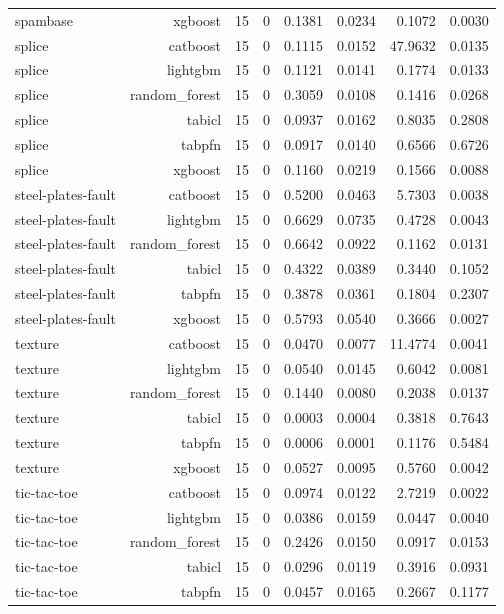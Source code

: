 \begin{table}[htbp]
\begin{tabular}{lrrrrrrr}
spambase & xgboost & 15 & 0 & 0.1381 & 0.0234 & 0.1072 & 0.0030 \\
splice & catboost & 15 & 0 & 0.1115 & 0.0152 & 47.9632 & 0.0135 \\
splice & lightgbm & 15 & 0 & 0.1121 & 0.0141 & 0.1774 & 0.0133 \\
splice & random\_forest & 15 & 0 & 0.3059 & 0.0108 & 0.1416 & 0.0268 \\
splice & tabicl & 15 & 0 & 0.0937 & 0.0162 & 0.8035 & 0.2808 \\
splice & tabpfn & 15 & 0 & 0.0917 & 0.0140 & 0.6566 & 0.6726 \\
splice & xgboost & 15 & 0 & 0.1160 & 0.0219 & 0.1566 & 0.0088 \\
steel-plates-fault & catboost & 15 & 0 & 0.5200 & 0.0463 & 5.7303 & 0.0038 \\
steel-plates-fault & lightgbm & 15 & 0 & 0.6629 & 0.0735 & 0.4728 & 0.0043 \\
steel-plates-fault & random\_forest & 15 & 0 & 0.6642 & 0.0922 & 0.1162 & 0.0131 \\
steel-plates-fault & tabicl & 15 & 0 & 0.4322 & 0.0389 & 0.3440 & 0.1052 \\
steel-plates-fault & tabpfn & 15 & 0 & 0.3878 & 0.0361 & 0.1804 & 0.2307 \\
steel-plates-fault & xgboost & 15 & 0 & 0.5793 & 0.0540 & 0.3666 & 0.0027 \\
texture & catboost & 15 & 0 & 0.0470 & 0.0077 & 11.4774 & 0.0041 \\
texture & lightgbm & 15 & 0 & 0.0540 & 0.0145 & 0.6042 & 0.0081 \\
texture & random\_forest & 15 & 0 & 0.1440 & 0.0080 & 0.2038 & 0.0137 \\
texture & tabicl & 15 & 0 & 0.0003 & 0.0004 & 0.3818 & 0.7643 \\
texture & tabpfn & 15 & 0 & 0.0006 & 0.0001 & 0.1176 & 0.5484 \\
texture & xgboost & 15 & 0 & 0.0527 & 0.0095 & 0.5760 & 0.0042 \\
tic-tac-toe & catboost & 15 & 0 & 0.0974 & 0.0122 & 2.7219 & 0.0022 \\
tic-tac-toe & lightgbm & 15 & 0 & 0.0386 & 0.0159 & 0.0447 & 0.0040 \\
tic-tac-toe & random\_forest & 15 & 0 & 0.2426 & 0.0150 & 0.0917 & 0.0153 \\
tic-tac-toe & tabicl & 15 & 0 & 0.0296 & 0.0119 & 0.3916 & 0.0931 \\
tic-tac-toe & tabpfn & 15 & 0 & 0.0457 & 0.0165 & 0.2667 & 0.1177 \\

\end{tabular}
\end{table}
